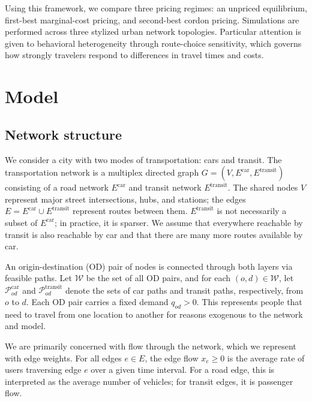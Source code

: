 \documentclass[12pt]{article}
\newcommand{\Ecar}{E^\text{car}}
\newcommand{\Etransit}{E^\text{transit}}
\newcommand{\W}{\mathcal{W}}
\newcommand{\Pset}{\mathcal{P}}
\newcommand{\PcarOD}{\Pset_{od}^\text{car}}
\newcommand{\PtransitOD}{\Pset_{od}^\text{transit}}
\begin{document}
Using this framework, we compare three pricing regimes: an unpriced equilibrium, first-best marginal-cost pricing, and second-best cordon pricing.
Simulations are performed across three stylized urban network topologies.
Particular attention is given to behavioral heterogeneity through route-choice sensitivity, which governs how strongly travelers respond to differences in travel times and costs.

\section{Model}

\subsection{Network structure}

We consider a city with two modes of transportation: cars and transit.
The transportation network is a multiplex directed graph $G = (V, \Ecar, \Etransit)$ consisting of a road network $\Ecar$ and transit network $\Etransit$.
The shared nodes $V$ represent major street intersections, hubs, and stations; the edges $E = \Ecar \cup \Etransit$ represent routes between them.
$\Etransit$ is not necessarily a subset of $\Ecar$; in practice, it is sparser.
We assume that everywhere reachable by transit is also reachable by car and that there are many more routes available by car.

An origin-destination (OD) pair of nodes is connected through both layers via feasible paths.
Let $\W$ be the set of all OD pairs, and for each $(o, d) \in \W$, let $\PcarOD$ and $\PtransitOD$ denote the sets of car paths and transit paths, respectively, from $o$ to $d$.
Each OD pair carries a fixed demand $q_{od} > 0$.
This represents people that need to travel from one location to another for reasons exogenous to the network and model.

We are primarily concerned with flow through the network, which we represent with edge weights.
For all edges $e \in E$, the edge flow $x_e \geq 0$ is the average rate of users traversing edge $e$ over a given time interval.
For a road edge, this is interpreted as the average number of vehicles; for transit edges, it is passenger flow.
\end{document}
